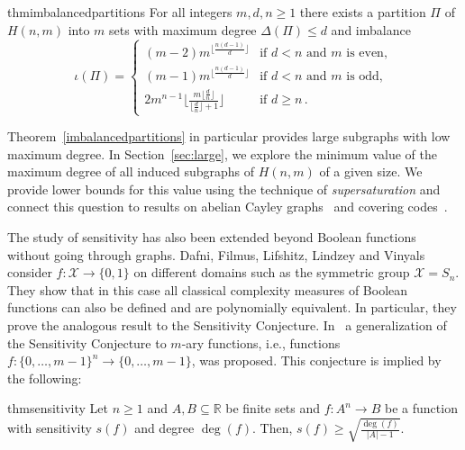 \documentclass[a4paper,10pt]{amsart}
\begin{document}
\begin{restatable}{thm}{imbalancedpartitions} 
\label{imbalancedpartitions}
For all integers $m,d,n\geq 1$ there exists a partition $\Pi$ of $H(n,m)$ into $m$ sets with maximum degree $\Delta(\Pi)\leq d$ and imbalance \[ \iota(\Pi) = \begin{cases} (m-2) m^{\lfloor \frac{n(d-1)}{d} \rfloor } & \text{if }  d < n \text{ and } m \text{ is even},\\
 (m-1) m^{\lfloor \frac{n(d-1)}{d} \rfloor } & \text{if }  d < n \text{ and } m \text{ is odd}, \\ 2 m^{n-1} \bigg\lfloor \frac{m \lfloor \frac{d}{n} \rfloor }{\lfloor \frac{d}{n} \rfloor + 1 } \bigg\rfloor & \text{if } d\geq n\, .\end{cases} \]
\end{restatable}



Theorem~\ref{imbalancedpartitions} in particular provides large subgraphs with low maximum degree. In Section~\ref{sec:large}, we explore the minimum value of the maximum degree of all induced subgraphs of $H(n,m)$ of a given size. We provide lower bounds for this value using the technique of \emph{supersaturation} and connect this question to results on abelian Cayley graphs~\cite{PT20} and covering codes~\cite{Rod70}.

The study of sensitivity has also been extended beyond Boolean functions without going through graphs. Dafni, Filmus, Lifshitz, Lindzey and Vinyals~\cite{DFLLV21} consider $f\colon \mathcal{X}\rightarrow\{0,1\}$ on different domains such as the symmetric group $\mathcal{X}=S_n$. They show that in this case all classical complexity measures of Boolean functions can also be defined and are polynomially equivalent. In particular, they prove the analogous result to the Sensitivity Conjecture. 
In~\cite{AGMK24} a generalization of the Sensitivity Conjecture to $m$-ary functions, i.e., functions $f\colon \{0,\ldots,m-1\}^n \to \{0,\ldots,m-1\}$, was proposed. This conjecture is implied by the following:

\begin{restatable}[\sf Sensitivity]{thm}{sensitivity}\label{thm.SensitivityConjecture}
Let $n\geq 1$ and $A,B\subseteq \mathbb{R}$ be finite sets and $f\colon A^n \to B$ be a function with sensitivity $s(f)$ and degree $\deg(f)$. Then, $s(f) \geq \sqrt{\frac{\deg(f)}{|A|-1}}$.
\end{restatable}
\end{document}
